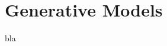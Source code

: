 %
%
%

\chapter{Generative Models}\label{chap:generative_models}
\enlargethispage{2ex}
\vspace*{-2pt}

\enlargethispage{2ex}


bla

%
